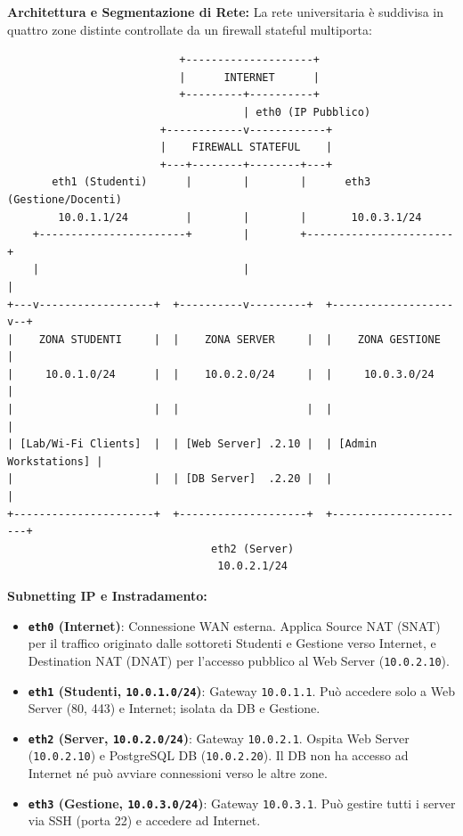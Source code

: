 \documentclass[11pt,a4paper]{article}
\begin{document}
\begin{solutionbox}
\textbf{Architettura e Segmentazione di Rete:}
La rete universitaria \`e suddivisa in quattro zone distinte controllate da un firewall stateful multiporta:
\begin{center}
\begin{verbatim}
                           +--------------------+
                           |      INTERNET      |
                           +---------+----------+
                                     | eth0 (IP Pubblico)
                        +------------v------------+
                        |    FIREWALL STATEFUL    |
                        +---+--------+--------+---+
       eth1 (Studenti)      |        |        |      eth3 (Gestione/Docenti)
        10.0.1.1/24         |        |        |       10.0.3.1/24
    +-----------------------+        |        +-----------------------+
    |                                |                                |
+---v------------------+  +----------v---------+  +-------------------v--+
|    ZONA STUDENTI     |  |    ZONA SERVER     |  |    ZONA GESTIONE     |
|     10.0.1.0/24      |  |    10.0.2.0/24     |  |     10.0.3.0/24      |
|                      |  |                    |  |                      |
| [Lab/Wi-Fi Clients]  |  | [Web Server] .2.10 |  | [Admin Workstations] |
|                      |  | [DB Server]  .2.20 |  |                      |
+----------------------+  +--------------------+  +----------------------+
                                eth2 (Server)
                                 10.0.2.1/24
\end{verbatim}
\end{center}

\textbf{Subnetting IP e Instradamento:}
\begin{itemize}
    \item \textbf{\texttt{eth0} (Internet)}: Connessione WAN esterna. Applica Source NAT (SNAT) per il traffico originato dalle sottoreti Studenti e Gestione verso Internet, e Destination NAT (DNAT) per l'accesso pubblico al Web Server (\texttt{10.0.2.10}).
    \item \textbf{\texttt{eth1} (Studenti, \texttt{10.0.1.0/24})}: Gateway \texttt{10.0.1.1}. Pu\`o accedere solo a Web Server (80, 443) e Internet; isolata da DB e Gestione.
    \item \textbf{\texttt{eth2} (Server, \texttt{10.0.2.0/24})}: Gateway \texttt{10.0.2.1}. Ospita Web Server (\texttt{10.0.2.10}) e PostgreSQL DB (\texttt{10.0.2.20}). Il DB non ha accesso ad Internet n\'e pu\`o avviare connessioni verso le altre zone.
    \item \textbf{\texttt{eth3} (Gestione, \texttt{10.0.3.0/24})}: Gateway \texttt{10.0.3.1}. Pu\`o gestire tutti i server via SSH (porta 22) e accedere ad Internet.
\end{itemize}


\end{solutionbox}
\end{document}
